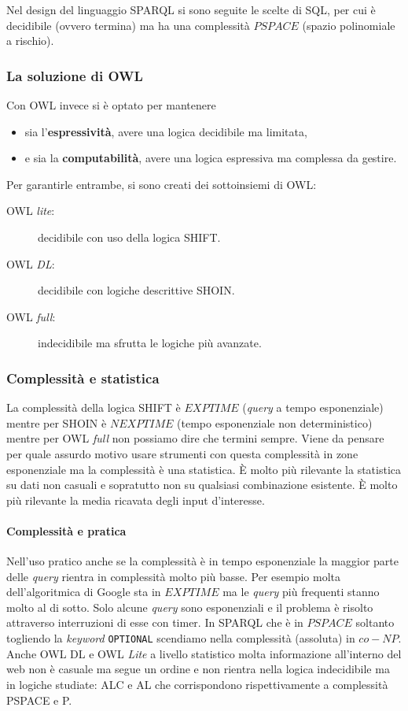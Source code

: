 			Nel design del linguaggio SPARQL si sono seguite le scelte di SQL, per cui è decidibile (ovvero termina) ma ha una complessità $PSPACE$ (spazio polinomiale a rischio).
			

			\subsubsection{La soluzione di OWL}
				Con OWL invece si è optato per mantenere
				\begin{itemize}[label={}]
					\item sia l'\textbf{espressività}, avere una logica decidibile ma limitata,
					\item e sia la \textbf{computabilità}, avere una logica espressiva ma complessa da gestire.
				\end{itemize}
				Per garantirle entrambe, si sono creati dei sottoinsiemi di OWL:
				\begin{description}
					\item[OWL \emph{lite}:] decidibile con uso della logica SHIFT.
					\item[OWL \emph{DL}:] decidibile con logiche descrittive SHOIN.
					\item[OWL \emph{full}:] indecidibile ma sfrutta le logiche più avanzate.
				\end{description}
				
			\subsubsection{Complessità e statistica}	
				La complessità della logica SHIFT è $EXPTIME$ (\emph{query} a tempo esponenziale) mentre per SHOIN è $NEXPTIME$ (tempo esponenziale non deterministico) mentre per OWL \emph{full} non possiamo dire che termini sempre. Viene da pensare per quale assurdo motivo usare strumenti con questa complessità in zone esponenziale ma la complessità è una statistica. È molto più rilevante la statistica su dati non casuali e sopratutto non su qualsiasi combinazione esistente. È molto più rilevante la media ricavata degli input d'interesse.
					
				\paragraph*{Complessità e pratica} Nell'uso pratico anche se la complessità è in tempo esponenziale la maggior parte delle \emph{query} rientra in complessità molto più basse. Per esempio molta dell'algoritmica di Google sta in $EXPTIME$ ma le \emph{query} più frequenti stanno molto al di sotto. Solo alcune \emph{query} sono esponenziali e il problema è risolto attraverso interruzioni di esse con timer. 
				In SPARQL che è in $PSPACE$ soltanto togliendo la \emph{keyword} \verb|OPTIONAL| scendiamo nella complessità (assoluta) in $co-NP$. Anche OWL DL e OWL \emph{Lite} a livello statistico molta informazione all'interno del web non è casuale ma segue un ordine e non rientra nella logica indecidibile ma in logiche studiate: ALC e AL che corrispondono rispettivamente a complessità PSPACE e P.				
		
